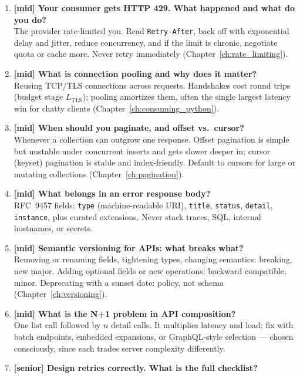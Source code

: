 \begin{enumerate}[label=\textbf{Q\arabic*.}, leftmargin=3.2em]
  \item \textbf{[mid] Your consumer gets HTTP 429. What happened and what do
    you do?}\\
    The provider rate-limited you. Read \texttt{Retry-After}, back off with
    exponential delay and jitter, reduce concurrency, and if the limit is
    chronic, negotiate quota or cache more. Never retry immediately
    (Chapter~\ref{ch:rate_limiting}).
  \item \textbf{[mid] What is connection pooling and why does it matter?}\\
    Reusing TCP/TLS connections across requests. Handshakes cost round
    trips (budget stage $L_{\mathrm{TLS}}$); pooling amortizes them,
    often the single largest latency win for chatty clients
    (Chapter~\ref{ch:consuming_python}).
  \item \textbf{[mid] When should you paginate, and offset vs.\ cursor?}\\
    Whenever a collection can outgrow one response. Offset pagination is
    simple but unstable under concurrent inserts and gets slower deeper in;
    cursor (keyset) pagination is stable and index-friendly. Default to
    cursors for large or mutating collections (Chapter~\ref{ch:pagination}).
  \item \textbf{[mid] What belongs in an error response body?}\\
    RFC~9457 fields: \texttt{type} (machine-readable URI), \texttt{title},
    \texttt{status}, \texttt{detail}, \texttt{instance}, plus curated
    extensions. Never stack traces, SQL, internal hostnames, or secrets.
  \item \textbf{[mid] Semantic versioning for APIs: what breaks what?}\\
    Removing or renaming fields, tightening types, changing semantics:
    breaking, new major. Adding optional fields or new operations:
    backward compatible, minor. Deprecating with a sunset date: policy,
    not schema (Chapter~\ref{ch:versioning}).
  \item \textbf{[mid] What is the N+1 problem in API composition?}\\
    One list call followed by $n$ detail calls. It multiplies latency and
    load; fix with batch endpoints, embedded expansions, or GraphQL-style
    selection --- chosen consciously, since each trades server complexity
    differently.
  \item \textbf{[senior] Design retries correctly. What is the full
    checklist?}\\

\end{enumerate}
